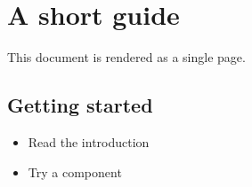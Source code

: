 \section*{A short guide}
This document is rendered as a single page.
\subsection*{Getting started}
\begin{itemize}
  \item Read the introduction
  \item Try a component
\end{itemize}
